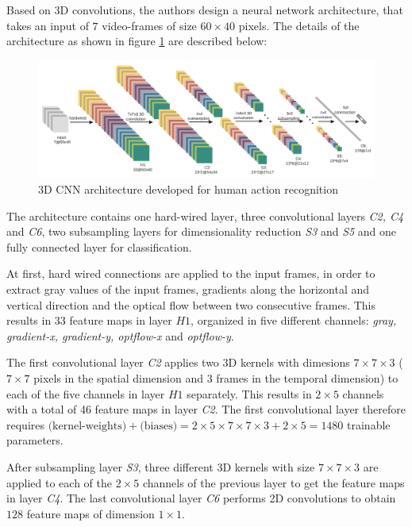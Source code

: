 Based on 3D convolutions, the authors design a neural network architecture, that takes an input of $7$ video-frames of size $60 \times 40$ pixels.
The details of the architecture as shown in figure \ref{fig:3dconv_architecture} are described below:

\begin{figure}[H]
    \centering
    \includegraphics[width=\textwidth]{img_deep/3dconv_architecture}
    \caption{3D CNN architecture developed for human action recognition \cite{ji_3d_2013}}
    \label{fig:3dconv_architecture}
\end{figure}
The architecture contains one hard-wired layer, three convolutional layers \textit{C2, C4} and \textit{C6}, two subsampling layers for dimensionality reduction \textit{S3} and \textit{S5} and one fully connected layer for classification.

At first, hard wired connections are applied to the input frames, in order to extract gray values of the input frames, gradients along the horizontal and vertical direction and the optical flow between two consecutive frames. This results in 33 feature maps in layer $H1$, organized in five different channels: \textit{gray, gradient-x, gradient-y, optflow-x} and \textit{optflow-y}.

The first convolutional layer \textit{C2} applies two 3D kernels with dimesions $7\times7\times3$ ($7\times7$ pixels in the spatial dimension and $3$ frames in the temporal dimension) to each of the five channels in layer $H1$ separately. 
This results in $2\times5$ channels with a total of 46 feature maps in layer \textit{C2}.
The first convolutional layer therefore requires $\text{(kernel-weights)} + \text{(biases)} = 2 \times 5 \times 7 \times 7 \times 3 + 2 \times 5 = 1480$ trainable parameters. 

After subsampling layer \textit{S3}, three different 3D kernels with size $7 \times 7 \times 3$ are applied to each of the $2 \times 5$ channels of the previous layer to get the feature maps in layer \textit{C4}.
The last convolutional layer \textit{C6} performs 2D convolutions to obtain $128$ feature maps of dimension $1 \times 1$.

